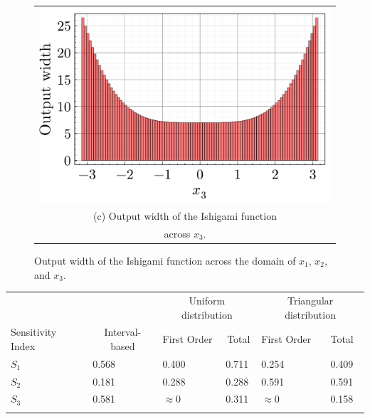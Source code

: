 \documentclass[twocolumn]{rps-esrel2022}
\begin{document}
\begin{figure}[!t]
	\begin{tabular}{@{}c@{}}
		\includegraphics[width=0.94\linewidth]{applications/ishigami_pinching_3.pdf} \\
		\small (c) Output width of the Ishigami function\\
		\small across $x_3$.
	  \end{tabular}

	\caption{Output width of the Ishigami function across the domain of $x_1$, $x_2$, and $x_3$.
	}
\end{figure}

\begin{table}[!h]
	{
	\begin{tabular}{@{}llllll@{}}\toprule 
	 &  & \multicolumn{2}{c}{Uniform distribution} & \multicolumn{2}{c}{Triangular distribution} \\ \colrule
	 Sensitivity Index & \multicolumn{1}{c|}{Interval-based} & First Order & \multicolumn{1}{c|}{Total} & First Order & Total \\ \colrule

	$S_1$ & 0.568 & 0.400 & 0.711 & 0.254 & 0.409\\
	$S_2$ & 0.181 & 0.288 & 0.288 & 0.591 & 0.591\\
	$S_3$ & 0.581 & $\approx 0$ & 0.311 & $\approx 0$ & 0.158\\
\botrule
	\end{tabular}}
\end{table}
\end{document}

